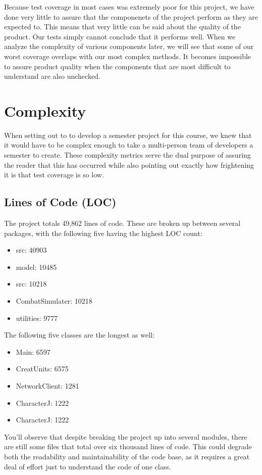 \documentclass[12pt,a4paper,titlepage]{article}
\begin{document}
Because test coverage in most cases was extremely poor for this project, we have done very 
little to assure that the componenets of the project perform as they are expected to. This 
means that very little can be said about the quality of the product. Our tests simply cannot 
conclude that it performs well. When we analyze the complexity of various components later, 
we will see that some of our worst coverage overlaps with our most complex methods. It 
becomes impossible to assure product quality when the components that are most difficult to 
understand are also unchecked.

\section{Complexity}
When setting out to to develop a semester project for this course, we knew that it would have 
to be complex enough to take a multi-person team of developers a semester to create. These 
complexity metrics serve the dual purpose of assuring the reader that this has occurred while 
also pointing out exactly how frightening it is that test coverage is so low.

\subsection{Lines of Code (LOC)}
The project totals 49,862 lines of code. These are broken up between several packages, with 
the following five having the highest LOC count:

\begin{itemize}
\item src: 40903
\item model: 10485
\item src: 10218
\item CombatSimulater: 10218
\item utilities: 9777
\end{itemize}

The following five classes are the longest as well:

\begin{itemize}
\item Main: 6597
\item CreatUnits: 6575
\item NetworkClient: 1281
\item CharacterJ: 1222
\item CharacterJ: 1222
\end{itemize}

You'll observe that despite breaking the project up into several modules, there are still some 
files that total over six thousand lines of code. This could degrade both the readability 
and maintainability of the code base, as it requires a great deal of effort just to 
understand the code of one class.
\end{document}
